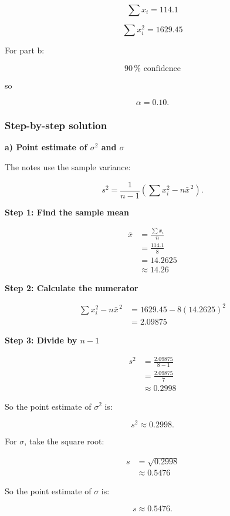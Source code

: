 \documentclass[10pt]{article}
\begin{document}
\[
\sum x_i=114.1
\]

\[
\sum x_i^2=1629.45
\]

For part b:

\[
90\,\%\text{ confidence}
\]

so

\[
\alpha=0.10.
\]

\subsubsection*{Step-by-step solution}

\textbf{a) Point estimate of $\sigma^2$ and $\sigma$}

The notes use the sample variance:

\[
s^2
=
\frac{1}{n-1}
\left(
\sum x_i^2-n\bar{x}^{\,2}
\right).
\]

\textbf{Step 1: Find the sample mean}

\begin{align*}
\bar{x}
&=
\frac{\sum x_i}{n} \\[2mm]
&=
\frac{114.1}{8} \\[2mm]
&=
14.2625 \\[2mm]
&\approx 14.26
\end{align*}

\textbf{Step 2: Calculate the numerator}

\begin{align*}
\sum x_i^2-n\bar{x}^{\,2}
&=
1629.45
-8(14.2625)^2 \\[2mm]
&=
2.09875
\end{align*}

\textbf{Step 3: Divide by $n-1$}

\begin{align*}
s^2
&=
\frac{2.09875}{8-1} \\[2mm]
&=
\frac{2.09875}{7} \\[2mm]
&\approx 0.2998
\end{align*}

So the point estimate of $\sigma^2$ is:

\[
s^2\approx 0.2998.
\]

For $\sigma$, take the square root:

\begin{align*}
s
&=
\sqrt{0.2998} \\[2mm]
&\approx 0.5476
\end{align*}

So the point estimate of $\sigma$ is:

\[
s\approx 0.5476.
\]
\end{document}
